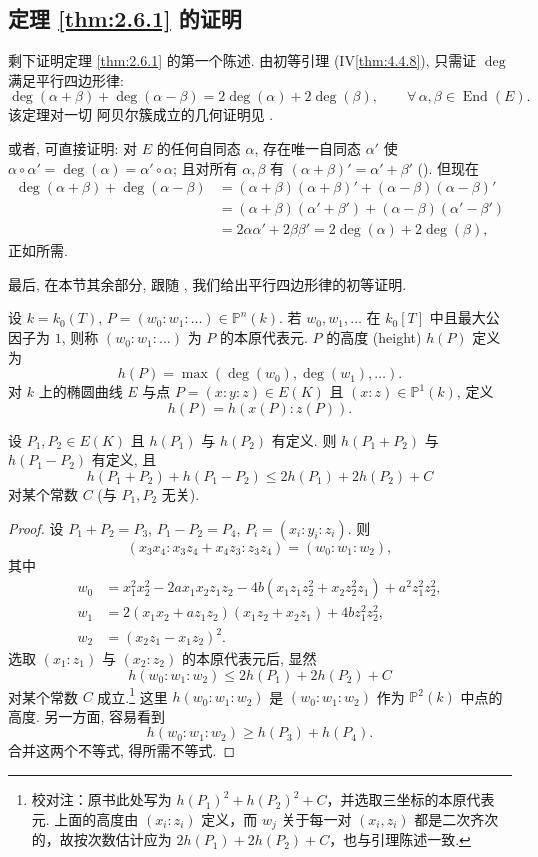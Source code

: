 \subsection*{定理 \ref{thm:2.6.1} 的证明}

剩下证明定理 \ref{thm:2.6.1} 的第一个陈述. 由初等引理 (IV\ref{thm:4.4.8}), 只需证 $\deg$ 满足平行四边形律:
\[
\deg(\alpha+\beta) + \deg(\alpha-\beta) = 2\deg(\alpha) + 2\deg(\beta), \qquad \forall\,\alpha,\beta\in\operatorname{End}(E).
\]
该定理对一切 阿贝尔簇成立的几何证明见 \cite[\S12]{milne1986a}.

或者, 可直接证明: 对 $E$ 的任何自同态 $\alpha$, 存在唯一自同态 $\alpha'$ 使 $\alpha\circ\alpha' = \deg(\alpha) = \alpha'\circ\alpha$; 且对所有 $\alpha,\beta$ 有 $(\alpha+\beta)' = \alpha' + \beta'$ (\cite[III, 6.2c]{silverman2009}). 但现在
\begin{align*}
\deg(\alpha+\beta) + \deg(\alpha-\beta) &= (\alpha+\beta)(\alpha+\beta)' + (\alpha-\beta)(\alpha-\beta)'\\
&= (\alpha+\beta)(\alpha' + \beta') + (\alpha-\beta)(\alpha' - \beta')\\
&= 2\alpha\alpha' + 2\beta\beta' = 2\deg(\alpha) + 2\deg(\beta),
\end{align*}
正如所需.

最后, 在本节其余部分, 跟随 \cite[\S24]{cassels1991}, 我们给出平行四边形律的初等证明.

设 $k = k_0(T)$, $P = (w_0:w_1:\dots)\in\mathbb{P}^n(k)$. 若 $w_0, w_1, \dots$ 在 $k_0[T]$ 中且最大公因子为 $1$, 则称 $(w_0:w_1:\dots)$ 为 $P$ 的本原代表元. $P$ 的高度 (height) $h(P)$ 定义为
\[
h(P) = \max(\deg(w_0), \deg(w_1), \dots).
\]
对 $k$ 上的椭圆曲线 $E$ 与点 $P = (x:y:z)\in E(K)$ 且 $(x:z)\in\mathbb{P}^1(k)$, 定义
\[
h(P) = h(x(P):z(P)).
\]

\begin{lemma} \label{thm:2.6.10} 
设 $P_1, P_2\in E(K)$ 且 $h(P_1)$ 与 $h(P_2)$ 有定义. 则 $h(P_1 + P_2)$ 与 $h(P_1 - P_2)$ 有定义, 且
\[
h(P_1+P_2) + h(P_1-P_2)\le 2h(P_1) + 2h(P_2) + C
\]
对某个常数 $C$ (与 $P_1, P_2$ 无关).
\end{lemma}

\begin{proof}
设 $P_1 + P_2 = P_3$, $P_1 - P_2 = P_4$, $P_i = (x_i:y_i:z_i)$. 则
\[
(x_3x_4:x_3z_4 + x_4z_3:z_3z_4) = (w_0:w_1:w_2),
\]
其中
\begin{align*}
w_0 &= x_1^2x_2^2 - 2ax_1x_2z_1z_2 - 4b(x_1z_1z_2^2 + x_2z_2^2z_1) + a^2z_1^2z_2^2,\\
w_1 &= 2(x_1x_2 + az_1z_2)(x_1z_2 + x_2z_1) + 4bz_1^2z_2^2,\\
w_2 &= (x_2z_1 - x_1z_2)^2.
\end{align*}
选取 $(x_1:z_1)$ 与 $(x_2:z_2)$ 的本原代表元后, 显然
\[
h(w_0:w_1:w_2)\le 2h(P_1) + 2h(P_2) + C
\]
对某个常数 $C$ 成立.\footnote{校对注：原书此处写为 $h(P_1)^2+h(P_2)^2+C$，并选取三坐标的本原代表元. 上面的高度由 $(x_i:z_i)$ 定义，而 $w_j$ 关于每一对 $(x_i,z_i)$ 都是二次齐次的，故按次数估计应为 $2h(P_1)+2h(P_2)+C$，也与引理陈述一致.} 这里 $h(w_0:w_1:w_2)$ 是 $(w_0:w_1:w_2)$ 作为 $\mathbb{P}^2(k)$ 中点的高度. 另一方面, 容易看到
\[
h(w_0:w_1:w_2)\ge h(P_3) + h(P_4).
\]
合并这两个不等式, 得所需不等式.
\end{proof}

